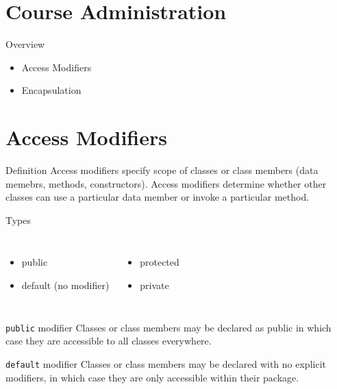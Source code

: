 \documentclass[10pt, compress]{beamer}
\begin{document}
\prepareCover

\section{Course Administration}

\begin{slide}
	\begin{block}{Overview}
		\begin{itemize}
			\item[] Access Modifiers
			\item[] Encapsulation
		\end{itemize}
	\end{block}
\end{slide}

\section{Access Modifiers}

\begin{slide}
	\begin{block}{Definition}
		Access modifiers specify scope of classes or class members (data memebrs, methods, constructors).
		Access modifiers determine whether other classes can use a particular data member or invoke a particular method.
	\end{block}
	\begin{block}{Types}
		\begin{columns}
			\begin{itemize}
				\item[] public
				\item[] default (no modifier)
			\end{itemize}
			\begin{itemize}
			\item[] protected
			\item[] private
			\end{itemize}
		\end{columns}
	\end{block}
\end{slide}

\begin{slide}
	\begin{block}{\texttt{public} modifier}
		Classes or class members may be declared as \alert{public} in which case they are accessible to all classes everywhere.
	\end{block}
	\begin{block}{\texttt{default} modifier}
		Classes or class members may be declared with no explicit modifiers, in which case they are only accessible within their package.
	\end{block}
\end{slide}
\end{document}
